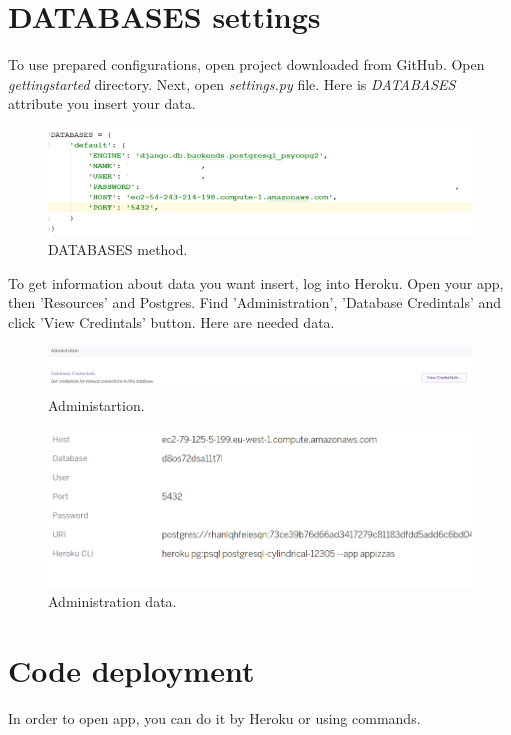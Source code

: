 \documentclass[12pt,a4paper]{article}
\begin{document}
\section{DATABASES settings}
To use prepared configurations, open project downloaded from GitHub. Open \textit{gettingstarted} directory. Next, open \textit{settings.py} file. Here is \textit{DATABASES} attribute you insert your data.  

\begin{figure}[H]
	\centering
	\includegraphics[width=1\textwidth]{images/databases.PNG}
	\caption{DATABASES method.}
	\label{fig:data}
\end{figure}

To get information about data you want insert, log into Heroku. Open your app, then 'Resources' and Postgres. Find 'Administration', 'Database Credintals' and click 'View Credintals' button. Here are needed data.

\begin{figure}[H]
	\centering
	\includegraphics[width=1\textwidth]{images/admin.PNG}
	\caption{Administartion.}
	\label{fig:ad}
\end{figure}

\begin{figure}[H]
	\centering
	\includegraphics[width=1\textwidth]{images/datas.PNG}
	\caption{Administration data.}
	\label{fig:da}
\end{figure}


\section{Code deployment}
In order to open app, you can do it by Heroku or using commands. \\
\end{document}
